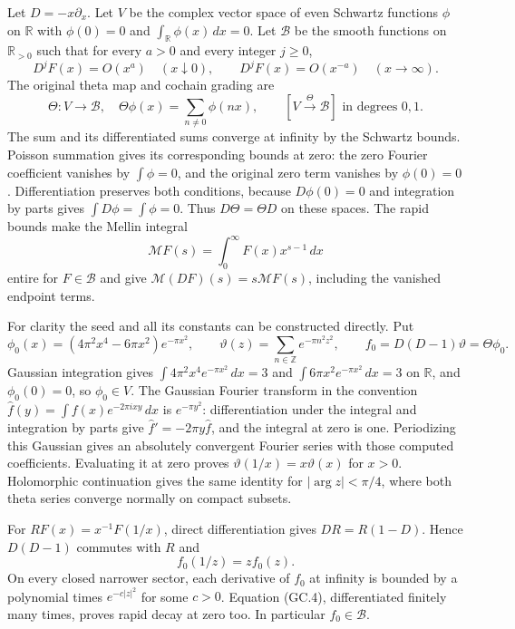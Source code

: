 Let $D=-x\partial_x$. Let $V$ be the complex vector space of even
Schwartz functions $\phi$ on $\mathbb R$ with
$\phi(0)=0$ and $\int_{\mathbb R}\phi(x)\,dx=0$. Let $\mathscr B$ be
the smooth functions on $\mathbb R_{>0}$ such that for every
$a>0$ and every integer $j\ge0$,
\[
 D^jF(x)=O(x^a)\quad(x\downarrow0),\qquad
 D^jF(x)=O(x^{-a})\quad(x\to\infty).
\]
The original theta map and cochain grading are
\[
 \Theta:V\longrightarrow\mathscr B,\quad
 \Theta\phi(x)=\sum_{n\ne0}\phi(nx),\qquad
 [V\xrightarrow{\Theta}\mathscr B]\text{ in degrees }0,1.
                                                               \tag{GC.2}
\]
The sum and its differentiated sums converge at infinity by the
Schwartz bounds. Poisson summation gives its corresponding bounds at
zero: the zero Fourier coefficient vanishes by $\int\phi=0$, and
the original zero term vanishes by $\phi(0)=0$. Differentiation
preserves both conditions, because $D\phi(0)=0$ and integration by
parts gives $\int D\phi=\int\phi=0$. Thus $D\Theta=\Theta D$ on
these spaces. The rapid bounds make the Mellin integral
\[
 \mathcal MF(s)=\int_0^\infty F(x)x^{s-1}\,dx
\]
entire for $F\in\mathscr B$ and give
$\mathcal M(DF)(s)=s\mathcal MF(s)$, including the vanished endpoint
terms.

For clarity the seed and all its constants can be constructed directly.
Put
\[
 \phi_0(x)=(4\pi^2x^4-6\pi x^2)e^{-\pi x^2},\qquad
 \vartheta(z)=\sum_{n\in\mathbb Z}e^{-\pi n^2z^2},\qquad
 f_0=D(D-1)\vartheta=\Theta\phi_0.                              \tag{GC.3}
\]
Gaussian integration gives $\int4\pi^2x^4e^{-\pi x^2}\,dx=3$ and
$\int6\pi x^2e^{-\pi x^2}\,dx=3$ on $\mathbb R$, and
$\phi_0(0)=0$, so $\phi_0\in V$. The Gaussian Fourier transform
in the convention $\widehat f(y)=\int f(x)e^{-2\pi ixy}\,dx$ is
$e^{-\pi y^2}$: differentiation under the integral and integration by
parts give $\widehat f'=-2\pi y\widehat f$, and the integral at zero
is one. Periodizing this Gaussian gives an absolutely convergent
Fourier series with those computed coefficients. Evaluating it at zero
proves $\vartheta(1/x)=x\vartheta(x)$ for $x>0$. Holomorphic
continuation gives the same identity for $|\arg z|<\pi/4$, where
both theta series converge normally on compact subsets.

For $RF(x)=x^{-1}F(1/x)$, direct differentiation gives
$DR=R(1-D)$. Hence $D(D-1)$ commutes with $R$ and
\[
 f_0(1/z)=z f_0(z).                                             \tag{GC.4}
\]
On every closed narrower sector, each derivative of $f_0$ at infinity
is bounded by a polynomial times $e^{-c|z|^2}$ for some $c>0$.
Equation (GC.4), differentiated finitely many times, proves rapid
decay at zero too. In particular $f_0\in\mathscr B$.


